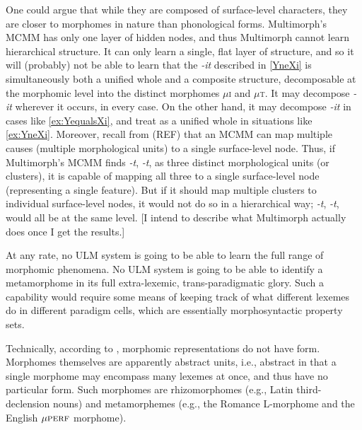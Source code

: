 One could argue that while they are composed of surface-level characters,
they are closer to morphomes in nature than phonological forms.
 Multimorph's \ac{MCMM} has only one layer of hidden nodes,
and thus Multimorph cannot learn hierarchical structure. It can only 
learn a single, flat layer of structure, and so it will (probably) not be able to learn
that the \textit{-it} described in \ref{YneXi} is simultaneously both a unified whole and a composite structure,
decomposable at the morphomic level into the distinct morphomes $\mu$\textsc{i} and $\mu$\textsc{t}.
It may decompose \textit{-it} wherever it occurs, in every case. 
On the other hand, it may decompose
\textit{-it} in cases like \ref{ex:YequalsXi}, and treat  
as a unified whole in situations like \ref{ex:YneXi}. Moreover, recall 
from (REF) that an \ac{MCMM} can map multiple causes (multiple morphological units)
 to a single surface-level node. Thus, if Multimorph's \ac{MCMM} finds 
 \textit{-t}, \textit{-t},  as three distinct
 morphological units (or clusters), it is capable of mapping all three 
 to a single surface-level node (representing a single feature). 
 But if it should map multiple clusters to individual surface-level nodes, it would not do so in a hierarchical way; \textit{-t}, \textit{-t},  would
 all be at the same level.
 [I intend to describe what Multimorph actually 
does once I get the results.]

At any rate, no \ac{ULM}  system is going to be able to learn the full range of morphomic
phenomena. No \ac{ULM}  system is going to be able to identify a metamorphome in its full
 extra-lexemic, trans-paradigmatic glory. Such a capability would require some means
of keeping track of what different lexemes do in different paradigm cells, which are essentially 
morphosyntactic property sets. %

	Technically, according to \cite{round:2011}, morphomic 
	representations do not have form. Morphomes
	themselves are apparently abstract units, i.e., abstract in that 
	a single morphome may encompass many lexemes at once, and thus
	have no particular form. Such morphomes are rhizomorphomes (e.g.,
	Latin third-declension nouns) and metamorphemes (e.g., the Romance L-morphome and the English
	${\mu}\textsc{perf}$ morphome).
	 
